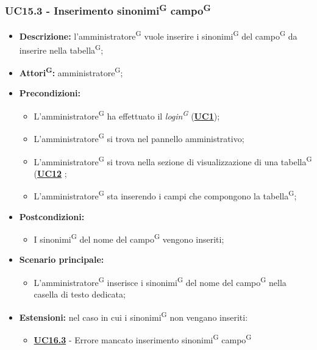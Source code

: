 \subsubsection{UC15.3 - Inserimento sinonimi\textsuperscript{G} campo\textsuperscript{G}}
\label{sec:UC15.3}
\begin{itemize}
	\item \textbf{Descrizione:} l’amministratore\textsuperscript{G} vuole inserire i sinonimi\textsuperscript{G} del campo\textsuperscript{G} da inserire nella tabella\textsuperscript{G};
	\item \textbf{Attori\textsuperscript{G}:} amministratore\textsuperscript{G};
	\item \textbf{Precondizioni:} 
	\begin{itemize}
		\item L’amministratore\textsuperscript{G} ha effettuato il \textit{login\textsuperscript{G}} (\hyperref[sec:UC1]{\textbf{UC1}});
		\item L’amministratore\textsuperscript{G} si trova nel pannello amministrativo;
		\item L’amministratore\textsuperscript{G} si trova nella sezione di visualizzazione di una tabella\textsuperscript{G} (\hyperref[sec:UC12]{\textbf{UC12}} ;
		\item L’amministratore\textsuperscript{G} sta inserendo i campi che compongono la tabella\textsuperscript{G};
	\end{itemize}
	\item \textbf{Postcondizioni:} 
	\begin{itemize}
		\item I sinonimi\textsuperscript{G} del nome del campo\textsuperscript{G} vengono inseriti;
	\end{itemize}
	\item \textbf{Scenario principale:} 
	\begin{itemize}
		\item L’amministratore\textsuperscript{G} inserisce i sinonimi\textsuperscript{G} del nome del campo\textsuperscript{G} nella casella di testo dedicata;
	\end{itemize}
	\item \textbf{Estensioni:} nel caso in cui i sinonimi\textsuperscript{G} non vengano inseriti:
	\begin{itemize}
		\item \hyperref[sec:UC16.3]{\textbf{UC16.3}} - Errore mancato inserimento sinonimi\textsuperscript{G} campo\textsuperscript{G}
	\end{itemize}
\end{itemize}

